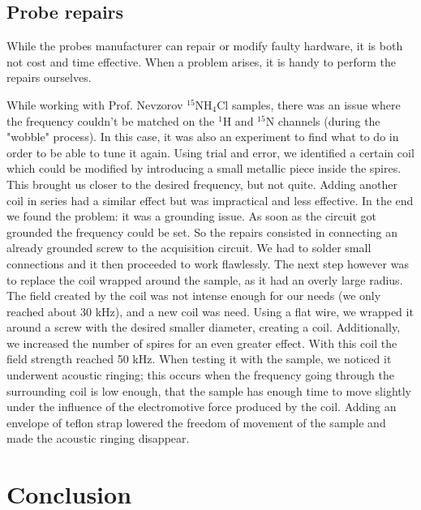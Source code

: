 \documentclass[12pt]{article}
\begin{document}
\subsection{Probe repairs}

While the probes manufacturer can repair or modify faulty hardware, it is both not cost and time effective. When a problem arises, it is handy to perform the repairs ourselves. 

While working with Prof. Nevzorov $^{15}$NH$_4$Cl samples, there was an issue where the frequency couldn't be matched on the $^1$H and $^{15}$N channels (during the "wobble" process). In this case, it was also an experiment to find what to do in order to be able to tune it again. Using trial and error, we identified a certain coil which could be modified by introducing a small metallic piece inside the spires. This brought us closer to the desired frequency, but not quite. Adding another coil in series had a similar effect but was impractical and less effective. In the end we found the problem: it was a grounding issue. As soon as the circuit got grounded the frequency could be set. So the repairs consisted in connecting an already grounded screw to the acquisition circuit. We had to solder small connections and it then proceeded to work flawlessly. 
The next step however was to replace the coil wrapped around the sample, as it had an overly large radius. The field created by the coil was not intense enough for our needs (we only reached about 30 kHz), and a new coil was need. Using a flat wire, we wrapped it around a screw with the desired smaller diameter, creating a coil. Additionally, we increased the number of spires for an even greater effect. With this coil the field strength reached 50 kHz. When testing it with the sample, we noticed it underwent acoustic ringing; this occurs when the frequency going through the surrounding coil is low enough, that the sample has enough time to move slightly under the influence of the electromotive force produced by the coil. Adding an envelope of teflon strap lowered the freedom of movement of the sample and made the acoustic ringing disappear.

\section{Conclusion}
\end{document}
